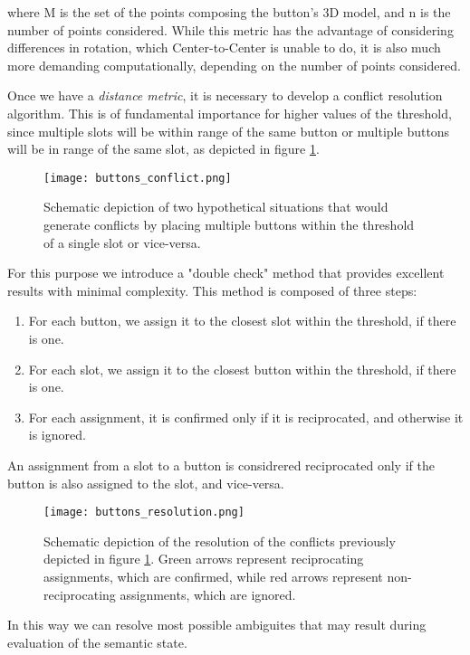 where M is the set of the points composing the button's 3D model, and n is the number of points considered. While this metric has the advantage of considering differences in rotation, which Center-to-Center is unable to do, it is also much more demanding computationally, depending on the number of points considered.

Once we have a \emph{distance metric}, it is necessary to develop a conflict resolution algorithm. This is of fundamental importance for higher values of the threshold, since multiple slots will be within range of the same button or multiple buttons will be in range of the same slot, as depicted in figure \ref{fig:conflicts}.

\begin{figure}[ht]
    \texttt{[image: buttons\_conflict.png]}
    \caption{Schematic depiction of two hypothetical situations that would generate conflicts by placing multiple buttons within the threshold of a single slot or vice-versa.}
    \label{fig:conflicts}
\end{figure}

For this purpose we introduce a "double check" method that provides excellent results with minimal complexity. This method is composed of three steps:

\begin{enumerate}
    \item For each button, we assign it to the closest slot within the threshold, if there is one.
    \item For each slot, we assign it to the closest button within the threshold, if there is one.
    \item For each assignment, it is confirmed only if it is reciprocated, and otherwise it is ignored.
\end{enumerate}

An assignment from a slot to a button is considrered reciprocated only if the button is also assigned to the slot, and vice-versa.

\begin{figure}[ht]
    \texttt{[image: buttons\_resolution.png]}
    \caption{Schematic depiction of the resolution of the conflicts previously depicted in figure \ref{fig:conflicts}. Green arrows represent reciprocating assignments, which are confirmed, while red arrows represent non-reciprocating assignments, which are ignored.}
    \label{fig:resolution}
\end{figure}

In this way we can resolve most possible ambiguites that may result during evaluation of the semantic state.

